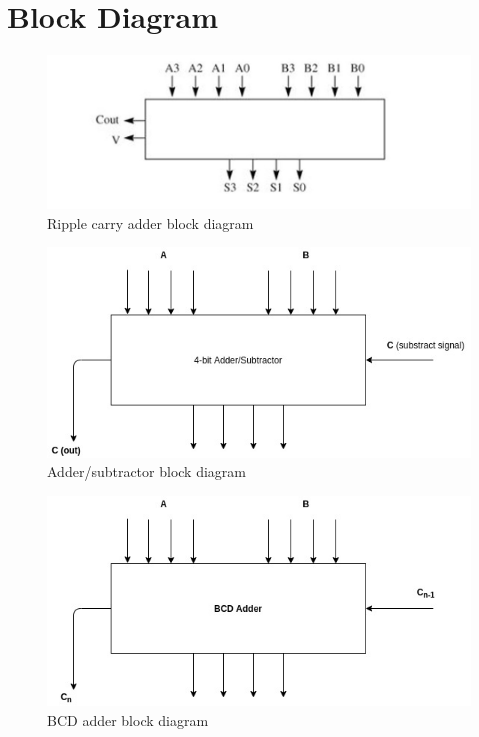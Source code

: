 \documentclass[titlepage]{article}
\begin{document}
    \section{Block Diagram} 
    \begin{figure}[!ht]
        \centering
        \includegraphics[width=15cm]{./figures/ripple_carry_bd.jpeg}
        \caption{Ripple carry adder block diagram}
    \end{figure}
    \begin{figure}[!ht]
        \centering
        \includegraphics[width=15cm]{./figures/4bit_adder_sub.jpeg}
        \caption{Adder/subtractor block diagram}
    \end{figure}
    \begin{figure}[!ht]
        \centering
        \includegraphics[width=15cm]{./figures/bcd_bd.jpeg}
        \caption{BCD adder block diagram}
    \end{figure}
\end{document}
